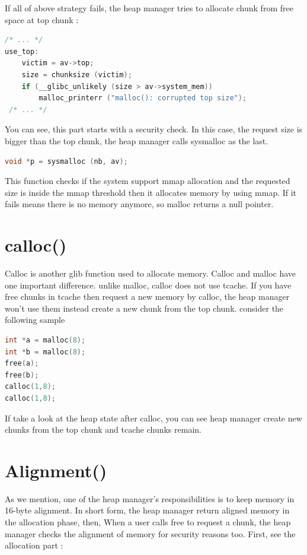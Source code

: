 \documentclass{masterthesis}
\newcommand*\tch{tcache}
\begin{document}
If all of above strategy fails, the heap manager tries to allocate chunk from free space at top chunk :

\begin{lstlisting}[language=c,frame=tlrb]
 /* ... */ 
use_top:
	victim = av->top;
	size = chunksize (victim);
	if (__glibc_unlikely (size > av->system_mem))
		malloc_printerr ("malloc(): corrupted top size");
 /* ... */ 
\end{lstlisting}

You can see, this part starts with a security check. In this case, the request size is bigger than the top chunk, the heap manager calls sysmalloc as the last.

\begin{lstlisting}[language=c,frame=tlrb]
 void *p = sysmalloc (nb, av);
 \end{lstlisting}

This function checks if the system support mmap allocation and the requested size is inside the mmap threshold then it allocates memory by using mmap. If it fails means there is no memory anymore, so malloc returns a null pointer.

\section{calloc()}
Calloc is another glib function used to allocate memory. Calloc and malloc have one important difference. unlike malloc, calloc does not use \tch{}. If you have free chunks in \tch{} then request a new memory by calloc, the heap manager won't use them instead create a new chunk from the top chunk. consider the following sample 

\begin{lstlisting}[language=c,frame=tlrb]
int *a = malloc(8);
int *b = malloc(8);
free(a);
free(b);
calloc(1,8);
calloc(1,8);
\end{lstlisting}

If take a look at the heap state after calloc, you can see heap manager create new chunks from the top chunk and \tch{} chunks remain.

\section{Alignment()}
As we mention, one of the heap manager's responsibilities is to keep memory in 16-byte alignment. In short form, the heap manager return aligned memory in the allocation phase, then, When a user calls free to request a chunk, the heap manager checks the alignment of memory for security reasons too. First, see the allocation part :
\end{document}
